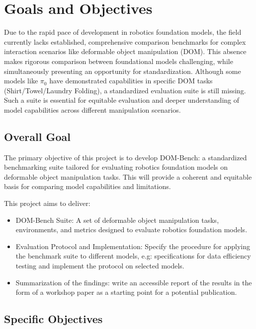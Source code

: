 \section{Goals and Objectives}
Due to the rapid pace of development in robotics foundation models, the field currently lacks established, comprehensive comparison benchmarks for complex interaction scenarios like deformable object manipulation (DOM).
This absence makes rigorous comparison between foundational models challenging, while simultaneously presenting an opportunity for standardization.
Although some models like $\pi_0$ \cite{pi_zero} have demonstrated capabilities in specific DOM tasks (Shirt/Towel/Laundry Folding), a standardized evaluation suite is still missing.
Such a suite is essential for equitable evaluation and deeper understanding of model capabilities across different manipulation scenarios.

\subsection{Overall Goal}
The primary objective of this project is to develop DOM-Bench: a standardized benchmarking suite tailored for evaluating robotics foundation models on deformable object manipulation tasks. This will provide a coherent and equitable basis for comparing model capabilities and limitations.

This project aims to deliver:
\begin{itemize}
    \item DOM-Bench Suite: A set of deformable object manipulation tasks, environments, and metrics designed to evaluate robotics foundation models.
    \item Evaluation Protocol and Implementation: Specify the procedure for applying the benchmark suite to different models, e.g: specifications for data efficiency testing and implement the protocol on selected models.
    \item Summarization of the findings: write an accessible report of the results in the form of a workshop paper as a starting point for a potential publication.
\end{itemize}


\subsection{Specific Objectives}
\vspace{4pt}

